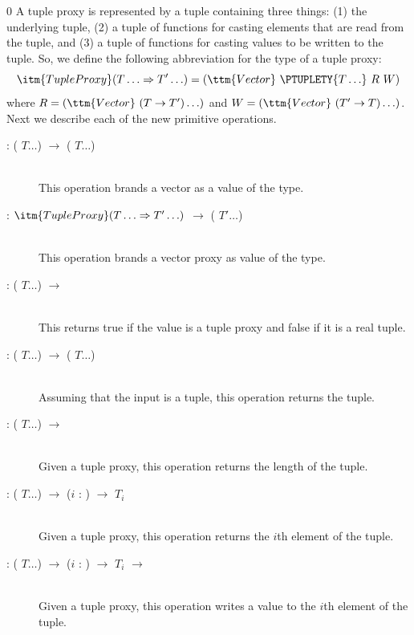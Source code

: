 \documentclass[7x10]{TimesAPriori_MIT}%
\def\racketEd{0}
\def\edition{1}
\numberwithin{theorem}{chapter}
\numberwithin{definition}{chapter}
\numberwithin{equation}{chapter}
\begin{document}
{\if\edition\racketEd    
A tuple proxy is represented by a tuple containing three things: (1) the
underlying tuple, (2) a tuple of functions for casting elements that
are read from the tuple, and (3) a tuple of functions for casting
values to be written to the tuple. So, we define the following
abbreviation for the type of a tuple proxy:
\[
\itm{TupleProxy} (T\ldots \Rightarrow T'\ldots)
= (\ttm{Vector}~\PTUPLETY{T\ldots} ~R~ W)
\]
where $R = (\ttm{Vector}~(T\to T') \ldots)$ and
$W = (\ttm{Vector}~(T'\to T) \ldots)$.
%
Next we describe each of the new primitive operations.

\begin{description}
\item[ : ( $T \ldots$) $\to$
  ( $T \ldots$)]\ \\
%
  This operation brands a vector as a value of the  type.
\item[ : $\itm{TupleProxy}(T\ldots \Rightarrow T'\ldots)$
  $\to$ ( $T' \ldots$)]\ \\
%
  This operation brands a vector proxy as value of the  type.
\item[ : ( $T \ldots$) $\to$
  \BOOLTY{}] \ \\
%
  This returns true if the value is a tuple proxy and false if it is a
  real tuple.
\item[ : ( $T \ldots$) $\to$
  ( $T \ldots$)]\ \\
%
  Assuming that the input is a tuple, this operation returns the
  tuple.
  
\item[ : ( $T \ldots$)
  $\to$ \INTTY{}]\ \\
%
  Given a tuple proxy, this operation returns the length of the tuple.
  
\item[ : ( $T \ldots$)
  $\to$ ($i$ : \INTTY{}) $\to$ $T_i$]\ \\
%
  Given a tuple proxy, this operation returns the $i$th element of the
  tuple.
  
\item[ : ( $T \ldots$) $\to$ ($i$
  : \INTTY{}) $\to$ $T_i$ $\to$ ]\ \\
  Given a tuple proxy, this operation writes a value to the $i$th element
  of the tuple.
\end{description}
\fi}
\end{document}
